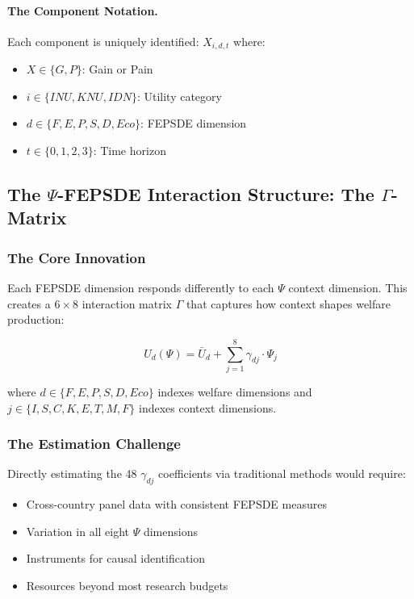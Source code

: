\paragraph{The Component Notation.}
Each component is uniquely identified: $X_{i,d,t}$ where:
\begin{itemize}
  \item $X \in \{G, P\}$: Gain or Pain
  \item $i \in \{INU, KNU, IDN\}$: Utility category
  \item $d \in \{F, E, P, S, D, Eco\}$: FEPSDE dimension
  \item $t \in \{0, 1, 2, 3\}$: Time horizon
\end{itemize}

\subsection{The $\Psi$-FEPSDE Interaction Structure: The $\Gamma$-Matrix}

\subsubsection{The Core Innovation}

Each FEPSDE dimension responds differently to each $\Psi$ context dimension.
This creates a $6 \times 8$ interaction matrix $\Gamma$ that captures how context
shapes welfare production:

\begin{equation}
  U_d(\Psi) = \bar{U}_d + \sum_{j=1}^{8} \gamma_{dj} \cdot \Psi_j
  \label{eq:U-Psi-interaction}
\end{equation}

where $d \in \{F, E, P, S, D, Eco\}$ indexes welfare dimensions
and $j \in \{I, S, C, K, E, T, M, F\}$ indexes context dimensions.

\subsubsection{The Estimation Challenge}

Directly estimating the 48 $\gamma_{dj}$ coefficients via traditional methods would require:
\begin{itemize}
  \item Cross-country panel data with consistent FEPSDE measures
  \item Variation in all eight $\Psi$ dimensions
  \item Instruments for causal identification
  \item Resources beyond most research budgets
\end{itemize}

